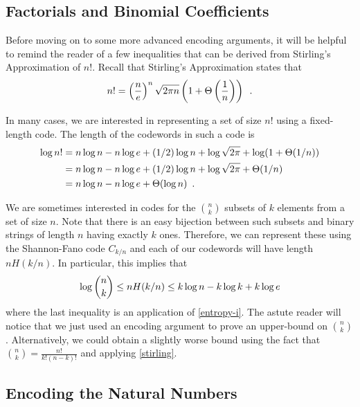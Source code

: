 \documentclass{patmorin}
\begin{document}
\subsection{Factorials and Binomial Coefficients}

Before moving on to some more advanced encoding arguments, it will be
helpful to remind the reader of a few inequalities that can be derived
from Stirling's Approximation of $n!$.  Recall that Stirling's
Approximation states that
\begin{equation}
  n! = \left(\frac{n}{e}\right)^n\sqrt{2\pi n}\left(1+\Theta\left(\frac{1}{n}\right)\right) \enspace .
  \eqlabel{stirling}
\end{equation}

In many cases, we are interested in representing a set of size $n!$
using a fixed-length code.  The length of the codewords in such a code
is
\begin{align}
  \log n!
  & = n\log n - n\log e + (1/2)\log n + \log \sqrt{2 \pi} + \log(1+\Theta(1/n)) \notag \\
  & = n\log n - n\log e + (1/2)\log n + \log \sqrt{2 \pi} + \Theta(1/n) \notag \\
  & = n\log n - n\log e + \Theta(\log n) \eqlabel{stirling-loose}
    \enspace .
\end{align}

We are sometimes interested in codes for the $\binom{n}{k}$ subsets of
$k$ elements from a set of size $n$. Note that there is an easy
bijection between such subsets and binary strings of length $n$ having
exactly $k$ ones. Therefore, we can represent these using the
Shannon-Fano code $C_{k/n}$ and each of our codewords will have length
$nH(k/n)$.  In particular, this implies that
\begin{equation}
  \log\binom{n}{k} \le nH(k/n) \le k\log n - k\log k + k\log e 
  \eqlabel{log-n-choose-k}
\end{equation}
where the last inequality is an application of \eqref{entropy-i}. The
astute reader will notice that we just used an encoding argument to
prove an upper-bound on $\binom{n}{k}$. Alternatively, we could obtain
a slightly worse bound using the fact that
$\binom{n}{k} = \frac{n!}{k! (n - k)!}$ and applying \eqref{stirling}.

\subsection{Encoding the Natural Numbers}
\end{document}
